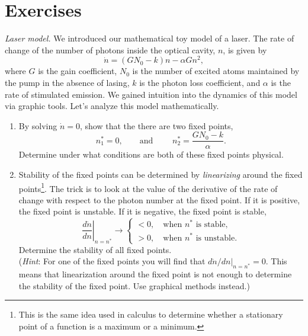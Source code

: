 \newpage
\section{Exercises}

\begin{exercise}
\emph{Laser model.} We introduced our mathematical toy model of a laser. The rate of change of the number of photons inside the optical cavity, $n$, is given by
\begin{equation}
    \dot{n} = (G N_0 - k) n - \alpha G n^2,
\end{equation}
where $G$ is the gain coefficient, $N_0$ is the number of excited atoms maintained by the pump in the absence of lasing, $k$ is the photon loss coefficient, and $\alpha$ is the rate of stimulated emission.
We gained intuition into the dynamics of this model via graphic tools.
Let's analyze this model mathematically.
\begin{enumerate}[label=(\alph*)]
    \item By solving $\dot{n} = 0$, show that the there are two fixed points,
    \begin{equation}
        n_1^* = 0, \qquad \text{and }\qquad n_2^*=\frac{GN_0 - k}{\alpha}.
    \end{equation}
    Determine under what conditions are both of these fixed points physical.
    \item Stability of the fixed points can be determined by \emph{linearizing} around the fixed points\footnote{This is the same idea used in calculus to determine whether a stationary point of a function is a maximum or a minimum.}.
    The trick is to look at the value of the derivative of the rate of change with respect to the photon number at the fixed point.
    If it is positive, the fixed point is unstable.
    If it is negative, the fixed point is stable,
    \begin{equation}
        \left.\frac{d\dot{n}}{dn}\right|_{n=n^*}\longrightarrow\begin{cases}
        <0, \quad\text{when } n^*\text{ is stable}, \\
        >0, \quad\text{when } n^*\text{ is unstable}.
    \end{cases}
    \end{equation}
    Determine the stability of all fixed points.\\
    (\emph{Hint}: For one of the fixed points you will find that $d\dot{n}/dn|_{n=n^*}=0$. This means that linearization around the fixed point is not enough to determine the stability of the fixed point. Use graphical methods instead.)
\end{enumerate}
\end{exercise}
